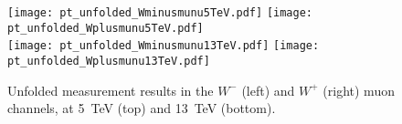 \begin{figure}[h]
	\centering
	{\texttt{[image: pt\_unfolded\_Wminusmunu5TeV.pdf]}}
{\texttt{[image: pt\_unfolded\_Wplusmunu5TeV.pdf]}} \\
{\texttt{[image: pt\_unfolded\_Wminusmunu13TeV.pdf]}}
{\texttt{[image: pt\_unfolded\_Wplusmunu13TeV.pdf]}}
	\caption{Unfolded measurement results in the $W^-$ (left) and $W^+$ (right) muon channels, at 5~TeV (top) and 13~TeV (bottom).}
	\label{fig:results_predictions_muon}
\end{figure}